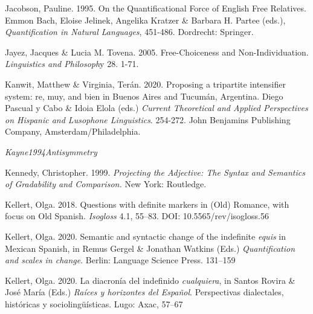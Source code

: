 \begin{styleStandard}
Jacobson, Pauline. 1995. On the Quantificational Force of English Free Relatives. Emmon Bach, Eloise Jelinek, Angelika Kratzer \& Barbara H. Partee (eds.), \textit{Quantification in Natural Languages}, 451-486. Dordrecht: Springer.
\end{styleStandard}

\begin{styleStandard}
Jayez, Jacques \& Lucia M. Tovena. 2005. Free-Choiceness and Non-Individuation. \textit{Linguistics and Philosoph}y 28. 1-71. 
\end{styleStandard}

\begin{styleStandard}
Kanwit, Matthew \& Virginia, Terán. 2020. Proposing a tripartite intensifier system: re, muy, and bien in Buenos Aires and Tucumán, Argentina. Diego Pascual y Cabo \& Idoia Elola (eds.) \textit{Current Theoretical and Applied Perspectives on Hispanic and Lusophone Linguistics}. 254-272. John Benjamins Publishing Company, Amsterdam/Philadelphia.
\end{styleStandard}

\begin{styleStandard}
\emph{\textmd{Kayne}}\emph{\textmd{1994}}\emph{\textmd{Antisymmetry}}
\end{styleStandard}

\begin{styleStandard}
Kennedy, Christopher. 1999. \textit{Projecting the Adjective: The Syntax and Semantics of Gradability and Comparison.} New York: Routledge.
\end{styleStandard}

\begin{styleStandard}
Kellert, Olga. 2018. Questions with definite markers in (Old) Romance, with focus on Old Spanish. \textit{Isogloss} 4.1, 55–83. DOI: 10.5565/rev/isogloss.56
\end{styleStandard}

\begin{styleStandard}
Kellert, Olga. 2020. Semantic and syntactic change of the indefinite \textit{equis} in Mexican Spanish, in Remus Gergel \& Jonathan Watkins (Eds.) \textit{Quantification and scales in change}. Berlin: Language Science Press. 131–159
\end{styleStandard}

\begin{styleStandard}
Kellert, Olga. 2020. La diacronía del indefinido \textit{cualquiera}, in Santos Rovira \& José María (Eds.) \textit{Raíces y horizontes del Español}. Perspectivas dialectales, históricas y sociolingüísticas. Lugo: Axac, 57–67 
\end{styleStandard}

